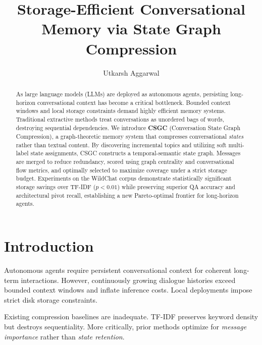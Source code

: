 \documentclass[10pt,twocolumn,letterpaper]{article}
\begin{document}
\title{Storage-Efficient Conversational Memory via State Graph Compression}

\author{Utkarsh Aggarwal\\
}

\maketitle

\begin{abstract}
As large language models (LLMs) are deployed as autonomous agents, persisting long-horizon conversational context has become a critical bottleneck. Bounded context windows and local storage constraints demand highly efficient memory systems. Traditional extractive methods treat conversations as unordered bags of words, destroying sequential dependencies. We introduce \textbf{CSGC} (Conversation State Graph Compression), a graph-theoretic memory system that compresses conversational \textit{states} rather than textual content. By discovering incremental topics and utilizing soft multi-label state assignments, CSGC constructs a temporal-semantic state graph. Messages are merged to reduce redundancy, scored using graph centrality and conversational flow metrics, and optimally selected to maximize coverage under a strict storage budget. Experiments on the WildChat corpus demonstrate statistically significant storage savings over TF-IDF ($p < 0.01$) while preserving superior QA accuracy and architectural pivot recall, establishing a new Pareto-optimal frontier for long-horizon agents.
\end{abstract}

\section{Introduction}
Autonomous agents require persistent conversational context for coherent long-term interactions. However, continuously growing dialogue histories exceed bounded context windows and inflate inference costs. Local deployments impose strict disk storage constraints.

Existing compression baselines are inadequate. TF-IDF preserves keyword density but destroys sequentiality. More critically, prior methods optimize for \textit{message importance} rather than \textit{state retention}. 
\end{document}
